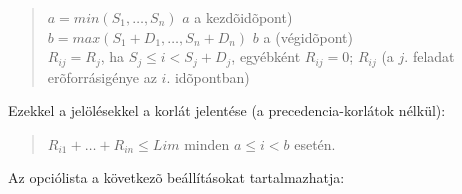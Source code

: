 \begin{quote}
$a = min(S_1,\ldots,S_n)$ {\rm $a$ a kezdõidõpont)} \\
$b = max(S_1+D_1,\ldots,S_n+D_n)$ {\rm $b$ a (végidõpont)}\\
$R_{ij} = R_j$, ha  $S_j \leq i < S_j+D_j$,
        egyébként $R_{ij} = 0$; {\rm $R_{ij}$ (a $j$. feladat erõforrásigénye
        az $i$. idõpontban)}
\end{quote}

Ezekkel a jelölésekkel a korlát jelentése (a precedencia-korlátok nélkül):

\begin{quote}
$R_{i1}+\ldots+R_{in} \leq Lim$ minden $a \leq i < b$ esetén.
\end{quote}

Az  opciólista a következõ beállításokat tartalmazhatja:

